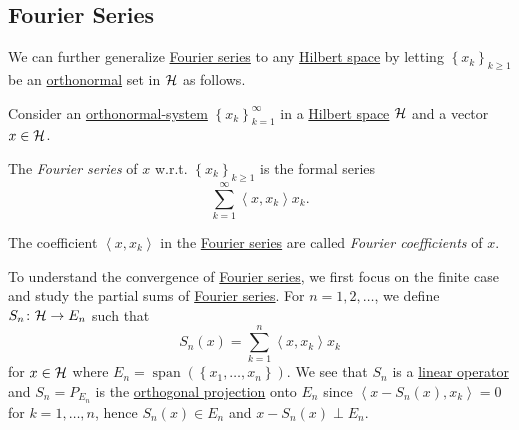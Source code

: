 \subsection{Fourier Series}
We can further generalize \hyperref[def:Fourier-series]{Fourier series} to any \hyperref[def:Hilbert-space]{Hilbert space} by letting \(\left\{ x_{k} \right\}_{k\geq 1} \) be an \hyperref[def:orthonormal-system]{orthonormal} set in \(\mathcal{\MakeUppercase{h}} \) as follows.

\begin{definition*}
	Consider an \hyperref[def:orthonormal-system]{orthonormal-system} \(\left\{ x_k \right\} _{k=1}^{\infty} \) in a \hyperref[def:Hilbert-space]{Hilbert space} \(\mathcal{\MakeUppercase{h}} \) and a vector \(x\in \mathcal{\MakeUppercase{h}} \).
	\begin{definition}\label{def:Fourier-series}
		The \emph{Fourier series} of \(x\) w.r.t. \(\left\{ x_k \right\}_{k\geq 1} \) is the formal series
		\[
			\sum_{k=1} ^{\infty} \left\langle x, x_k \right\rangle x_k.
		\]
	\end{definition}
	\begin{definition}\label{def:Fourier-coefficient}
		The coefficient \(\left\langle x, x_k \right\rangle \) in the \hyperref[def:Fourier-series]{Fourier series} are called \emph{Fourier coefficients} of \(x\).
	\end{definition}
\end{definition*}

To understand the convergence of \hyperref[def:Fourier-series]{Fourier series}, we first focus on the finite case and study the partial sums of \hyperref[def:Fourier-series]{Fourier series}. For \(n = 1, 2, \ldots  \), we define \(S_{n} \colon \mathcal{\MakeUppercase{h}} \to E_{n} \) such that
\[
	S_n (x)= \sum_{k=1}^{n} \left\langle x, x_{k}  \right\rangle x_{k}
\]
for \(x\in \mathcal{\MakeUppercase{h}} \) where \(E_{n} = \mathop{\mathrm{span}}(\left\{ x_1, \ldots , x_{n}\right\})\). We see that \(S_n\) is a \hyperref[def:linear-map]{linear operator} and \(S_n= P_{E_n}\) is the \hyperref[def:orthogonal-projection]{orthogonal projection} onto \(E_n\) since \(\left\langle x -S_n(x), x_k \right\rangle = 0\) for \(k = 1, \ldots  , n\), hence \(S_{n} (x)\in E_{n}\) and \(x-S_n(x)\perp E_n\).

